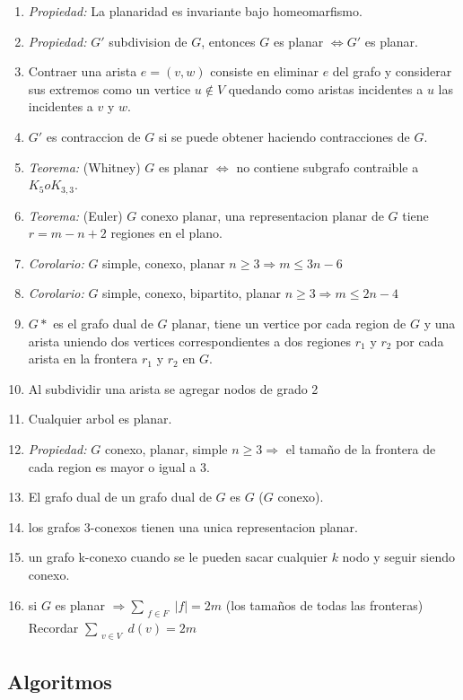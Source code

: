 \begin{enumerate}
\item \textit{Propiedad:} La planaridad es invariante bajo homeomarfismo.
\item \textit{Propiedad:} $G'$ subdivision de $G$, entonces $G$ es planar $\iff G'$ es planar.
\item Contraer una arista $e=(v,w)$ consiste en eliminar $e$ del grafo y considerar sus extremos como un vertice $u \notin V$ quedando como aristas incidentes a $u$ las incidentes a $v$ y $w$.
\item $G'$ es contraccion de $G$ si se puede obtener haciendo contracciones de $G$.
\item \textit{Teorema:} (Whitney) $G$ es planar $\iff$ no contiene subgrafo contraible a $K_{5} o K_{3,3}$.
\item \textit{Teorema:} (Euler) $G$ conexo planar, una representacion planar de $G$ tiene $r=m-n+2$ regiones en el plano.
\item \textit{Corolario:} $G$ simple, conexo, planar $n \geq 3 \Rightarrow m \leq 3n-6$
\item \textit{Corolario:} $G$ simple, conexo, bipartito, planar $n \geq 3 \Rightarrow m \leq 2n-4$
\item $G*$ es el grafo dual de $G$ planar, tiene un vertice por cada region de $G$ y una arista uniendo dos vertices correspondientes a dos regiones $r_{1}$ y $r_{2}$ por cada arista en la frontera $r_{1}$ y $r_{2}$ en $G$.
\item Al subdividir una arista se agregar nodos de grado 2
\item Cualquier arbol es planar.
\item \textit{Propiedad:} $G$ conexo, planar, simple $n \geq 3 \Rightarrow$ el tamaño de la frontera de cada region es mayor o igual a $3$.
\item El grafo dual de un grafo dual de $G$ es $G$ ($G$ conexo).
\item los grafos 3-conexos tienen una unica representacion planar.
\item un grafo k-conexo cuando se le pueden sacar cualquier $k$ nodo y seguir siendo conexo.
\item si $G$ es planar $\Rightarrow \sum_{\substack{f \in F}}|f| = 2m$ (los tamaños de todas las fronteras) Recordar $\sum_{\substack{v \in V}}d(v) = 2m$
\end{enumerate}

\subsection{Algoritmos}
